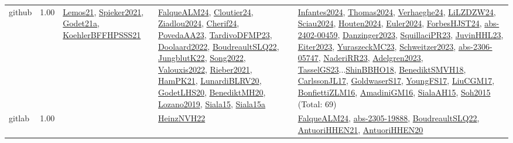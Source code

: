 {\begin{longtable}{p{3cm}r>{\raggedright\arraybackslash}p{6cm}>{\raggedright\arraybackslash}p{6cm}>{\raggedright\arraybackslash}p{8cm}}
\index{github}\index{Benchmarks!github}github &  1.00 & \hyperref[detail:Lemos21]{Lemos21}, \hyperref[detail:Spieker2021]{Spieker2021}, \hyperref[detail:Godet21a]{Godet21a}, \hyperref[detail:KoehlerBFFHPSSS21]{KoehlerBFFHPSSS21} & \hyperref[detail:FalqueALM24]{FalqueALM24}, \hyperref[detail:Cloutier24]{Cloutier24}, \hyperref[detail:Ziadlou2024]{Ziadlou2024}, \hyperref[detail:Cherif24]{Cherif24}, \hyperref[detail:PovedaAA23]{PovedaAA23}, \hyperref[detail:TardivoDFMP23]{TardivoDFMP23}, \hyperref[detail:Doolaard2022]{Doolaard2022}, \hyperref[detail:BoudreaultSLQ22]{BoudreaultSLQ22}, \hyperref[detail:JungblutK22]{JungblutK22}, \hyperref[detail:Song2022]{Song2022}, \hyperref[detail:Valouxis2022]{Valouxis2022}, \hyperref[detail:Rieber2021]{Rieber2021}, \hyperref[detail:HamPK21]{HamPK21}, \hyperref[detail:LunardiBLRV20]{LunardiBLRV20}, \hyperref[detail:GodetLHS20]{GodetLHS20}, \hyperref[detail:BenediktMH20]{BenediktMH20}, \hyperref[detail:Lozano2019]{Lozano2019}, \hyperref[detail:Siala15]{Siala15}, \hyperref[detail:Siala15a]{Siala15a} & \hyperref[detail:Infantes2024]{Infantes2024}, \hyperref[detail:Thomas2024]{Thomas2024}, \hyperref[detail:Verhaeghe24]{Verhaeghe24}, \hyperref[detail:LiLZDZW24]{LiLZDZW24}, \hyperref[detail:Sciau2024]{Sciau2024}, \hyperref[detail:Houten2024]{Houten2024}, \hyperref[detail:Euler2024]{Euler2024}, \hyperref[detail:ForbesHJST24]{ForbesHJST24}, \hyperref[detail:abs-2402-00459]{abs-2402-00459}, \hyperref[detail:Danzinger2023]{Danzinger2023}, \hyperref[detail:SquillaciPR23]{SquillaciPR23}, \hyperref[detail:JuvinHHL23]{JuvinHHL23}, \hyperref[detail:Eiter2023]{Eiter2023}, \hyperref[detail:YuraszeckMC23]{YuraszeckMC23}, \hyperref[detail:Schweitzer2023]{Schweitzer2023}, \hyperref[detail:abs-2306-05747]{abs-2306-05747}, \hyperref[detail:NaderiRR23]{NaderiRR23}, \hyperref[detail:Adelgren2023]{Adelgren2023}, \hyperref[detail:TasselGS23]{TasselGS23}...\hyperref[detail:ShinBBHO18]{ShinBBHO18}, \hyperref[detail:BenediktSMVH18]{BenediktSMVH18}, \hyperref[detail:CarlssonJL17]{CarlssonJL17}, \hyperref[detail:GoldwaserS17]{GoldwaserS17}, \hyperref[detail:YoungFS17]{YoungFS17}, \hyperref[detail:LiuCGM17]{LiuCGM17}, \hyperref[detail:BonfiettiZLM16]{BonfiettiZLM16}, \hyperref[detail:AmadiniGM16]{AmadiniGM16}, \hyperref[detail:SialaAH15]{SialaAH15}, \hyperref[detail:Soh2015]{Soh2015} (Total: 69)\\
\index{gitlab}\index{Benchmarks!gitlab}gitlab &  1.00 &  & \hyperref[detail:HeinzNVH22]{HeinzNVH22} & \hyperref[detail:FalqueALM24]{FalqueALM24}, \hyperref[detail:abs-2305-19888]{abs-2305-19888}, \hyperref[detail:BoudreaultSLQ22]{BoudreaultSLQ22}, \hyperref[detail:AntuoriHHEN21]{AntuoriHHEN21}, \hyperref[detail:AntuoriHHEN20]{AntuoriHHEN20}\\

\end{longtable}}
